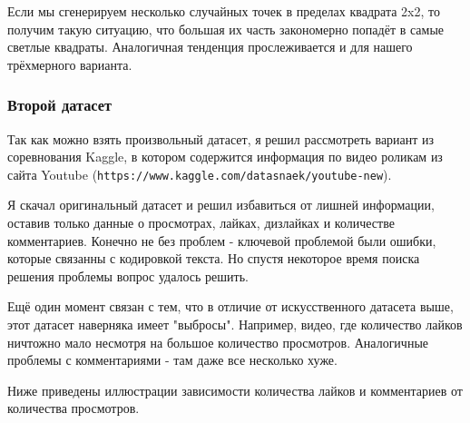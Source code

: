 \documentclass[12pt]{article}
\begin{document}
	Если мы сгенерируем несколько случайных точек в пределах квадрата 2x2, то получим такую ситуацию, что большая их часть закономерно попадёт в самые светлые квадраты. Аналогичная тенденция прослеживается и для нашего трёхмерного варианта.
	
	\subsubsection*{Второй датасет}
	Так как можно взять произвольный датасет, я решил рассмотреть вариант из соревнования Kaggle, в котором содержится информация по видео роликам из сайта Youtube ({\tt https://www.kaggle.com/datasnaek/youtube-new}).
	
	Я скачал оригинальный датасет и решил избавиться от лишней информации, оставив только данные о просмотрах, лайках, дизлайках и количестве комментариев. Конечно не без проблем - ключевой проблемой были ошибки, которые связанны с кодировкой текста. Но спустя некоторое время поиска решения проблемы вопрос удалось решить.
	
	Ещё один момент связан с тем, что в отличие от искусственного датасета выше, этот датасет наверняка имеет "выбросы". Например, видео, где количество лайков ничтожно мало несмотря на большое количество просмотров. Аналогичные проблемы с комментариями - там даже все несколько хуже. 
	
	Ниже приведены иллюстрации зависимости количества лайков и комментариев от количества просмотров.
	
\end{document}

